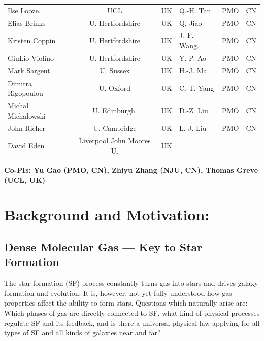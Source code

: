 \documentclass[legal,11pt]{article}
\begin{document}
\begin{table}[htbp]
\begin{threeparttable}[b]
\begin{tabular}{lcclcc}
Ilse Looze.          & UCL               & UK & Q.-H. Tan         & PMO           & CN \\
Elias Brinks         & U. Hertfordshire  & UK & Q. Jiao           & PMO           & CN \\
Kristen Coppin       & U. Hertfordshire  & UK & J.-F. Wang.       & PMO           & CN \\
GiuLio Violino       & U. Hertfordshire  & UK & Y.-P. Ao          & PMO           & CN \\
Mark Sargent         & U. Sussex         & UK & H.-J. Ma          & PMO           & CN \\
Dimitra Rigopoulou   & U. Oxford         & UK & C.-T. Yang        & PMO           & CN \\
Michal Michalowski   & U. Edinburgh.     & UK & D.-Z. Liu         & PMO           & CN \\
John Richer          & U. Cambridge      & UK & L.-J. Liu         & PMO           & CN \\
David Eden           & Liverpool John Moores U.  & UK & \\ 

\hline
\end{tabular}
 
\begin{tablenotes}
{\bf Co-PIs: Yu Gao (PMO, CN), Zhiyu Zhang (NJU, CN), Thomas Greve (UCL, UK)}\\
\end{tablenotes}
\end{threeparttable}

\end{table}



\clearpage
\justify
\medskip


\section{Background and Motivation:}

\subsection{Dense Molecular Gas --- Key to Star Formation }


The star formation (SF) process constantly turns gas into stars and drives 
galaxy formation and evolution. It is, however, not yet fully understood how 
gas properties affect the ability to form stars. Questions which naturally arise
are: Which phases of gas are directly connected to SF, what kind of physical
processes regulate SF and its feedback, and is there a universal physical law
applying for all types of SF and all kinds of galaxies near and far?   
\end{document}
